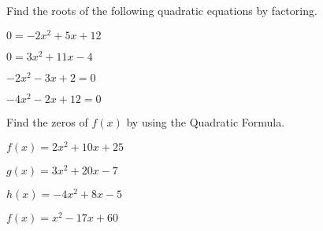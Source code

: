 \documentclass{report}
\theoremstyle{definition}
\begin{document}
\noindent Find the roots of the following quadratic equations by factoring.


\begin{enumerate}
\setcounter{enumi}{22}


\begin{minipage}[t]{0.45\linewidth}
\item $0=-2x^2+5x+12$
\end{minipage}
\hfill
\begin{minipage}[t]{0.45\linewidth}
\item $0=3x^2 +11x-4$
\end{minipage}

\vspace{2.5cm}

\begin{minipage}[t]{0.45\linewidth}
\item $-2x^2-3x+2=0$
\end{minipage}
\hfill
\begin{minipage}[t]{0.45\linewidth}
\item $-4x^2-2x+12=0$
\end{minipage}

\end{enumerate}
\vfill



\noindent Find the zeros of $f(x)$ by using the Quadratic Formula.

\begin{enumerate}
\setcounter{enumi}{26}


\begin{minipage}[t]{0.45\linewidth}
\item $f(x)=2x^2+10x+25$
\end{minipage}
\hfill
\begin{minipage}[t]{0.45\linewidth}
\item $g(x)=3x^2+20x-7$
\end{minipage}

\vspace{2.5cm}

\begin{minipage}[t]{0.45\linewidth}
\item $h(x) = -4x^2+8x-5$
\end{minipage}
\hfill
\begin{minipage}[t]{0.45\linewidth}
\item $f(x)=x^2-17x+60$
\end{minipage}

\end{enumerate}
\vfill
\end{document}
